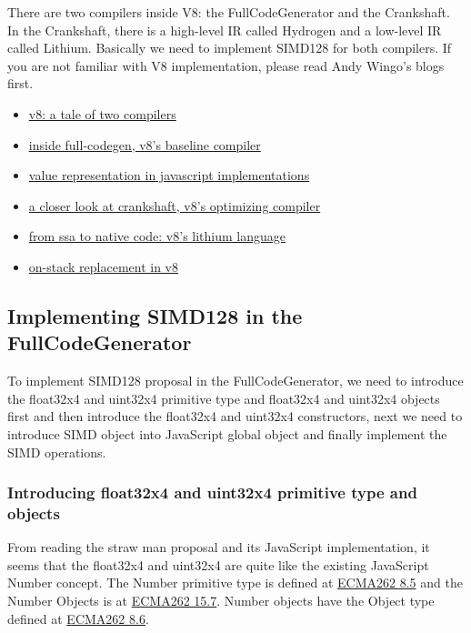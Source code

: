 \documentclass[12pt]{article} %
\begin{document}
\mbox{}

There are two compilers inside V8: the FullCodeGenerator and the Crankshaft.
In the Crankshaft, there is a high-level IR called Hydrogen and a low-level IR
called Lithium. Basically we need to implement SIMD128 for both compilers. If
you are not familiar with V8 implementation, please read Andy Wingo's blogs
first.

\begin{itemize}
  \item \href{http://wingolog.org/archives/2011/07/05/v8-a-tale-of-two-compilers}{v8: a tale of two compilers}
  \item \href{http://wingolog.org/archives/2013/04/18/inside-full-codegen-v8s-baseline-compiler}{inside full-codegen, v8's baseline compiler}
  \item \href{http://wingolog.org/archives/2011/05/18/value-representation-in-javascript-implementations}{value representation in javascript implementations}
  \item \href{http://wingolog.org/archives/2011/08/02/a-closer-look-at-crankshaft-v8s-optimizing-compiler}{a closer look at crankshaft, v8's optimizing compiler}
  \item \href{http://wingolog.org/archives/2011/09/05/from-ssa-to-native-code-v8s-lithium-language}{from ssa to native code: v8's lithium language}
  \item \href{http://wingolog.org/archives/2011/06/20/on-stack-replacement-in-v8}{on-stack replacement in v8}
\end{itemize}

\subsection{Implementing SIMD128 in the FullCodeGenerator}

To implement SIMD128 proposal in the FullCodeGenerator, we need to introduce
the float32x4 and uint32x4 primitive type and float32x4 and uint32x4 objects
first and then introduce the float32x4 and uint32x4 constructors, next we need
to introduce SIMD object into JavaScript global object and finally implement
the SIMD operations.

\subsubsection{Introducing float32x4 and uint32x4 primitive type and objects}
From reading the straw man proposal and its JavaScript implementation, it seems
that the float32x4 and uint32x4 are quite like the existing JavaScript Number
concept. The Number primitive type is defined at
\href{http://www.ecma-international.org/ecma-262/5.1/\#sec-8.5}{ECMA262 8.5}
and the Number Objects is at
\href{http://www.ecma-international.org/ecma-262/5.1/#sec-15.7}{ECMA262 15.7}. Number objects have the Object type defined at \href{http://www.ecma-international.org/ecma-262/5.1/\#sec-8.6}{ECMA262 8.6}.
\end{document}
